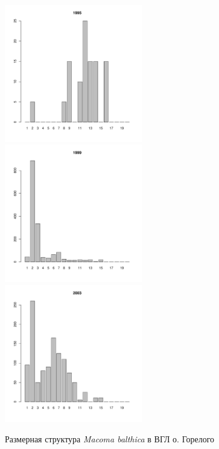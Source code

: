 \documentclass[12pt, a4paper]{article}
\begin{document}
\begin{figure}[h]
\begin{multicols}{3}
\hfill
\includegraphics[width=60mm]{../White_Sea/Luvenga_Goreliy/high_1995_.pdf}
\hfill
\includegraphics[width=60mm]{../White_Sea/Luvenga_Goreliy/high_1999_.pdf}
\hfill
\includegraphics[width=60mm]{../White_Sea/Luvenga_Goreliy/high_2003_.pdf}
\end{multicols}


\caption{Размерная структура {\it Macoma balthica} в ВГЛ о. Горелого}
\label{ris:size_str_Goreliy_high}
\end{figure}
\end{document}
